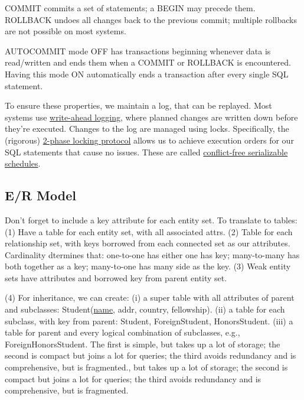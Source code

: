 \documentclass[10pt,letterpaper,twocolumn]{article}
\begin{document}
COMMIT commits a set of statements; a BEGIN may 
precede them. ROLLBACK undoes all changes back to 
the previous commit; multiple rollbacks are not 
possible on most systems. 

AUTOCOMMIT mode OFF has transactions beginning 
whenever data is read/written and ends them when
a COMMIT or ROLLBACK is encountered. Having this 
mode ON automatically ends a transaction after
every single SQL statement. 

To ensure these properties, we maintain a log, 
that can be replayed. Most systems use 
\underline{write-ahead logging}, where planned
changes are written down before they're executed.  
Changes to the log are managed using locks. 
Specifically, the (rigorous) \underline{2-phase
locking protocol} allows us to achieve execution 
orders for our SQL statements that cause no
issues. These are called \underline{conflict-free
serializable schedules}.


\subsection{E/R Model} 

Don't forget to include a key attribute for each 
entity set. To translate to tables: (1) Have a 
table for each entity set, with all associated attrs.
(2) Table for each relationship set, with keys borrowed
from each connected set as our attributes. Cardinality
dtermines that: one-to-one has either one has key; 
many-to-many has both together as a key; many-to-one
has many side as the key. (3) Weak entity sets have attributes
and borrowed key from parent entity set. 

(4) For inheritance, 
we can create: (i) a super table with all attributes 
of parent and subclasses: Student(\underline{name}, addr, 
country, fellowship).
(ii) a table for each subclass, with key from parent: 
Student, ForeignStudent, HonorsStudent. (iii) a table 
for parent and every logical combination of subclasses, 
e.g., ForeignHonorsStudent. The first is simple, but
takes up a lot of storage; the second is compact but
joins a lot for queries; the third avoids redundancy
and is comprehensive, but is fragmented., but
takes up a lot of storage; the second is compact but
joins a lot for queries; the third avoids redundancy
and is comprehensive, but is fragmented.
\end{document}
